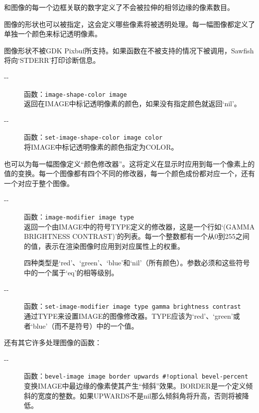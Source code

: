 \documentclass{book}
\begin{document}
\begin{CJK*}{UTF8}{gbsn}
\begin{description}
和图像的每一个边框关联的数字定义了不会被拉伸的相邻边缘的像素数目。
\end{description}

图像的形状也可以被指定，这会定义哪些像素将被透明处理。每一幅图像都定义了单独一个颜色来标记透明像素。

图像形状不被GDK Pixbuf所支持。如果函数在不被支持的情况下被调用，Sawfish将向`STDERR'打印诊断信息。
\begin{description}
\item[-{}-] 函数：\verb|image-shape-color image|\\
返回在IMAGE中标记透明像素的颜色，如果没有指定颜色就返回`nil'。
\item[-{}-] 函数：\verb|set-image-shape-color image color|\\
将IMAGE中标记透明像素的颜色指定为COLOR。
\end{description}

也可以为每一幅图像定义``颜色修改器''。这将定义在显示时应用到每一个像素上的值的变换。每一个图像都有四个不同的修改器，每一个颜色成份都对应一个，还有一个对应于整个图像。
\begin{description}
\item[-{}-] 函数：\verb|image-modifier image type|\\
返回一个由IMAGE中的符号TYPE定义的修改器，这是一个行如`(GAMMA BRIGHTNESS CONTRAST)'的列表。每一个整数都有一个从0到255之间的值，表示在渲染图像时应用到对应属性上的权重。

四种类型是`red'、`green'、`blue'和`nil'（所有颜色）。参数必须和这些符号中的一个属于`eq'的相等级别。
\item[-{}-] 函数：\verb|set-image-modifier image type gamma brightness contrast|\\
通过TYPE来设置IMAGE的图像修改器。TYPE应该为`red'、`green'或者`blue'（而不是符号）中的一个值。
\end{description}

还有其它许多处理图像的函数：
\begin{description}
\item[-{}-] 函数：\verb|bevel-image image border upwards #!optional bevel-percent|\\
变换IMAGE中最边缘的像素使其产生``倾斜''效果。BORDER是一个定义倾斜的宽度的整数。如果UPWARDS不是nil那么倾斜角将升高，否则将被降低。


\end{description}
\end{CJK*}
\end{document}
